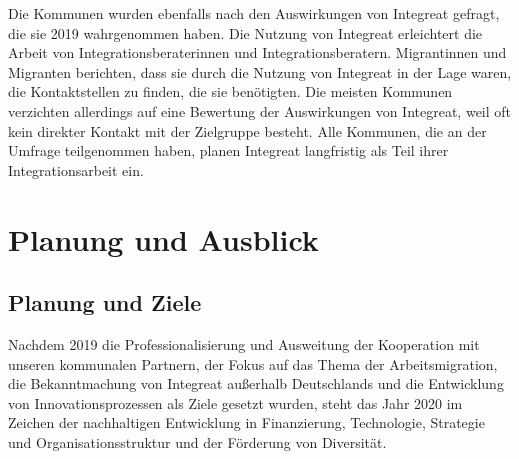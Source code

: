 \documentclass[12pt, a4paper]{article} %
\begin{document}
\begin{itemize}
Die Kommunen wurden ebenfalls nach den Auswirkungen von Integreat
gefragt, die sie 2019 wahrgenommen haben. Die Nutzung von Integreat
erleichtert die Arbeit von Integrationsberaterinnen und
Integrationsberatern. Migrantinnen und Migranten berichten, dass sie
durch die Nutzung von Integreat in der Lage waren, die Kontaktstellen zu
finden, die sie benötigten. Die meisten Kommunen verzichten allerdings
auf eine Bewertung der Auswirkungen von Integreat, weil oft kein
direkter Kontakt mit der Zielgruppe besteht. Alle Kommunen, die an der
Umfrage teilgenommen haben, planen Integreat langfristig als Teil ihrer
Integrationsarbeit ein.
\end{itemize}

\hypertarget{planung-und-ausblick}{%
\section{Planung und Ausblick}\label{planung-und-ausblick}}

\hypertarget{planung-und-ziele}{%
\subsection{Planung und Ziele}\label{planung-und-ziele}}

Nachdem 2019 die Professionalisierung und Ausweitung der Kooperation mit
unseren kommunalen Partnern, der Fokus auf das Thema der
Arbeitsmigration, die Bekanntmachung von Integreat außerhalb
Deutschlands und die Entwicklung von Innovationsprozessen als Ziele
gesetzt wurden, steht das Jahr 2020 im Zeichen der nachhaltigen
Entwicklung in Finanzierung, Technologie, Strategie und
Organisationsstruktur und der Förderung von Diversität.
\end{document}
